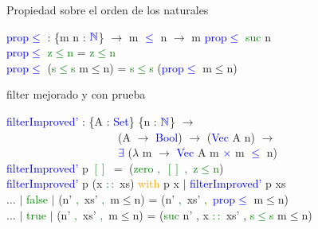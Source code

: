 \documentclass[xcolor=dvipsnames]{beamer} %
\newcommand{\cf}[1]{\textcolor{blue}{#1}}
\newcommand{\ct}[1]{\textcolor{blue}{#1}}
\newcommand{\cc}[1]{\textcolor{green}{#1}}
\newcommand{\ck}[1]{\textcolor{orange}{#1}}
\newcommand{\N}{\ct{\mathbb{N}}}
\newcommand{\ra}{\rightarrow}
\newcommand{\T}{ \ \ \ \ }
\begin{document}
\begin{frame}

\begin{block}{Propiedad sobre el orden de los naturales}

\cf{prop$\leq$} : \{m n : $\N$\} $\ra$ m \ct{$\leq$} n $\ra$ m \cf{prop$\leq$} \cc{suc} n\\
\cf{prop$\leq$} \cc{z$\leq$n} = \cc{z$\leq$n}\\
\cf{prop$\leq$} (\cc{s$\leq$s} m$\leq$n) = \cc{s$\leq$s} (\cf{prop$\leq$} m$\leq$n)

\end{block}

\begin{block}{filter mejorado y con prueba}

\cf{filterImproved'} : \{A : \ct{Set}\} \{n : $\N$\} $\ra$\\
\T \T \T \T \ \ 
(A $\ra$ \ct{Bool}) $\ra$ (\ct{Vec} A n) $\ra$\\
\T \T \T \T \ \ 
\ct{$\exists$} ($\lambda$ m $\ra$ \ct{Vec} A m \ct{$\times$} m \ct{$\leq$} n)\\
\cf{filterImproved'} p \cc{$[]$} $=$ (\cc{zero} \cc{$,$} \cc{$[]$} \cc{$,$} \cc{z$\leq$n})\\
\cf{filterImproved'} p (x \cc{$::$} xs) \ck{with} p x $|$ \cf{filterImproved'} p xs\\
$\ldots$ $|$ \cc{false} $|$ (n' \cc{$,$} xs' \cc{$,$} m$\leq$n) = 
(n' \cc{$,$} xs' \cc{$,$} \cf{prop$\leq$} m$\leq$n)\\
$\ldots$ $|$ \cc{true}  $|$ (n' \cc{$,$} xs' \cc{$,$} m$\leq$n) = 
(\cc{suc} n' , x \cc{$::$} xs' , \cc{s$\leq$s} m$\leq$n)

\end{block}

\end{frame}
\end{document}
